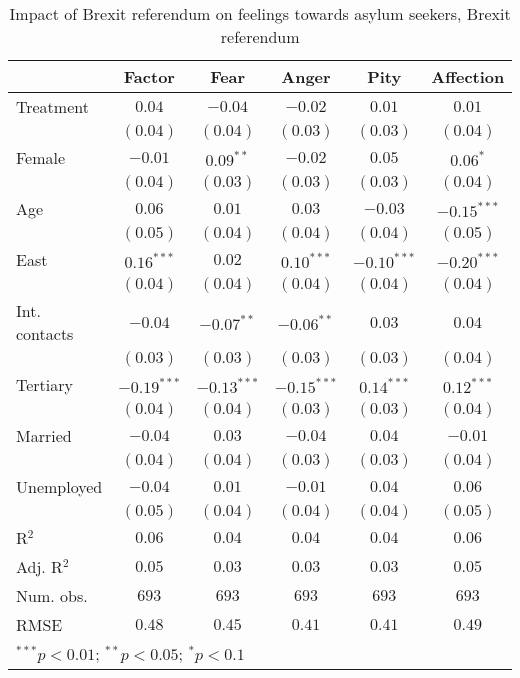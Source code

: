
\begin{table}
\caption{Impact of Brexit referendum on feelings towards asylum seekers, Brexit referendum}
\begin{center}
\begin{tabular}{l c c c c c}
\toprule
 & Factor & Fear & Anger & Pity & Affection \\
\midrule
Treatment     & $0.04$        & $-0.04$       & $-0.02$       & $0.01$        & $0.01$        \\
              & $(0.04)$      & $(0.04)$      & $(0.03)$      & $(0.03)$      & $(0.04)$      \\
Female        & $-0.01$       & $0.09^{**}$   & $-0.02$       & $0.05$        & $0.06^{*}$    \\
              & $(0.04)$      & $(0.03)$      & $(0.03)$      & $(0.03)$      & $(0.04)$      \\
Age           & $0.06$        & $0.01$        & $0.03$        & $-0.03$       & $-0.15^{***}$ \\
              & $(0.05)$      & $(0.04)$      & $(0.04)$      & $(0.04)$      & $(0.05)$      \\
East          & $0.16^{***}$  & $0.02$        & $0.10^{***}$  & $-0.10^{***}$ & $-0.20^{***}$ \\
              & $(0.04)$      & $(0.04)$      & $(0.04)$      & $(0.04)$      & $(0.04)$      \\
Int. contacts & $-0.04$       & $-0.07^{**}$  & $-0.06^{**}$  & $0.03$        & $0.04$        \\
              & $(0.03)$      & $(0.03)$      & $(0.03)$      & $(0.03)$      & $(0.04)$      \\
Tertiary      & $-0.19^{***}$ & $-0.13^{***}$ & $-0.15^{***}$ & $0.14^{***}$  & $0.12^{***}$  \\
              & $(0.04)$      & $(0.04)$      & $(0.03)$      & $(0.03)$      & $(0.04)$      \\
Married       & $-0.04$       & $0.03$        & $-0.04$       & $0.04$        & $-0.01$       \\
              & $(0.04)$      & $(0.04)$      & $(0.03)$      & $(0.03)$      & $(0.04)$      \\
Unemployed    & $-0.04$       & $0.01$        & $-0.01$       & $0.04$        & $0.06$        \\
              & $(0.05)$      & $(0.04)$      & $(0.04)$      & $(0.04)$      & $(0.05)$      \\
\midrule
R$^2$         & $0.06$        & $0.04$        & $0.04$        & $0.04$        & $0.06$        \\
Adj. R$^2$    & $0.05$        & $0.03$        & $0.03$        & $0.03$        & $0.05$        \\
Num. obs.     & $693$         & $693$         & $693$         & $693$         & $693$         \\
RMSE          & $0.48$        & $0.45$        & $0.41$        & $0.41$        & $0.49$        \\
\bottomrule
\multicolumn{6}{l}{\scriptsize{$^{***}p<0.01$; $^{**}p<0.05$; $^{*}p<0.1$}}
\end{tabular}
\label{tab_emo_brexit}
\end{center}
\end{table}

